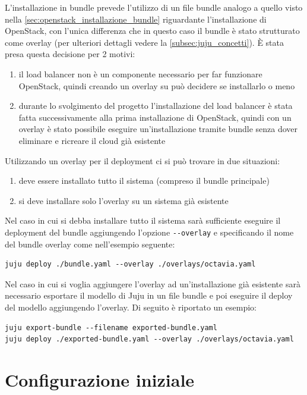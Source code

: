 L'installazione in bundle prevede l'utilizzo di un file bundle analogo a quello visto nella \cref{sec:openstack_installazione_bundle} riguardante l'installazione di OpenStack, con l'unica differenza che in questo caso il bundle è stato strutturato come overlay (per ulteriori dettagli vedere la \cref{subsec:juju_concetti}).
È stata presa questa decisione per 2 motivi:
\begin{enumerate}
    \item il load balancer non è un componente necessario per far funzionare OpenStack, quindi creando un overlay su può decidere se installarlo o meno
    \item durante lo svolgimento del progetto l'installazione del load balancer è stata fatta successivamente alla prima installazione di OpenStack, quindi con un overlay è stato possibile eseguire un'installazione tramite bundle senza dover eliminare e ricreare il cloud già esistente
\end{enumerate}

Utilizzando un overlay per il deployment ci si può trovare in due situazioni:
\begin{enumerate}
    \item deve essere installato tutto il sistema (compreso il bundle principale)
    \item si deve installare solo l'overlay su un sistema già esistente
\end{enumerate}

Nel caso in cui si debba installare tutto il sistema sarà sufficiente eseguire il deployment del bundle aggiungendo l'opzione \verb|--overlay| e specificando il nome del bundle overlay come nell'esempio seguente:
\begin{lstlisting}[language=mybash]
juju deploy ./bundle.yaml --overlay ./overlays/octavia.yaml
\end{lstlisting}

Nel caso in cui si voglia aggiungere l'overlay ad un'installazione già esistente sarà necessario esportare il modello di Juju in un file bundle e poi eseguire il deploy del modello aggiungendo l'overlay. Di seguito è riportato un esempio:
\begin{lstlisting}[language=mybash]
juju export-bundle --filename exported-bundle.yaml
juju deploy ./exported-bundle.yaml --overlay ./overlays/octavia.yaml
\end{lstlisting}

\section{Configurazione iniziale}


